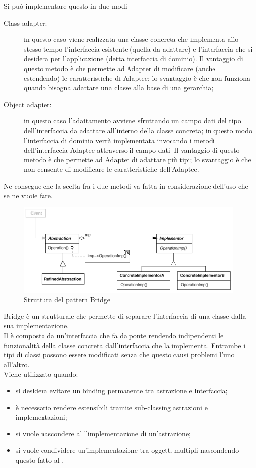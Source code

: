 	Si può implementare questo  in due modi:
	\begin{description}
		\item[Class adapter:] in questo caso viene realizzata una classe concreta che implementa allo stesso tempo l'interfaccia esistente (quella da adattare) e l'interfaccia che si desidera per l'applicazione (detta interfaccia di dominio). Il vantaggio di questo metodo è che permette ad Adapter di modificare (anche estendendo) le caratteristiche di Adaptee; lo svantaggio è che non funziona quando bisogna adattare una classe alla base di una gerarchia;
		\item[Object adapter:] in questo caso l'adattamento avviene sfruttando un campo dati del tipo dell'interfaccia da adattare all'interno della classe concreta; in questo modo l'interfaccia di dominio verrà implementata invocando i metodi dell'interfaccia Adaptee attraverso il campo dati. Il vantaggio di questo metodo è che permette ad Adapter di adattare più tipi; lo svantaggio è che non consente di modificare le caratteristiche dell'Adaptee.
	\end{description}
	Ne consegue che la scelta fra i due metodi va fatta in considerazione dell'uso che se ne vuole fare.

	 \label{app:bridge}
	\begin{figure}[H]\centering
    \includegraphics[scale=0.7]{SpecificaTecnica/Pics/Bridge}
    \caption{Struttura del pattern Bridge}
	\end{figure}
	Bridge è un  strutturale che permette di separare l’interfaccia di una classe dalla sua implementazione. \\
	Il  è composto da un’interfaccia che fa da ponte rendendo indipendenti le funzionalità della classe concreta dall’interfaccia che la implementa. Entrambe i tipi di classi possono essere modificati senza che questo causi problemi l’uno all’altro. \\
	Viene utilizzato quando:
	\begin{itemize}
		\item si desidera evitare un binding permanente tra astrazione e interfaccia;
		\item è necessario rendere estensibili tramite sub-classing astrazioni e implementazioni;
		\item si vuole nascondere al  l'implementazione di un'astrazione;
		\item si vuole condividere un'implementazione tra oggetti multipli nascondendo questo fatto al .
	\end{itemize}

